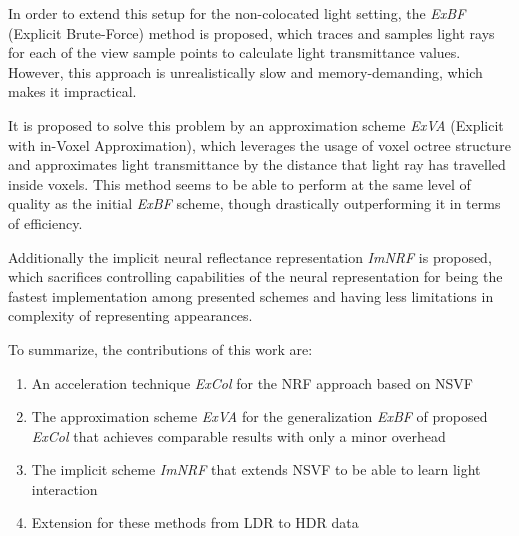 In order to extend this setup for the non-colocated light setting, the \textit{ExBF} (Explicit Brute-Force) method is proposed,
which traces and samples light rays for each of the view sample points to calculate light transmittance values.
However, this approach is unrealistically slow and memory-demanding,
which makes it impractical.

It is proposed to solve this problem by an approximation scheme \textit{ExVA} (Explicit with in-Voxel Approximation),
which leverages the usage of voxel octree structure
and approximates light transmittance by the distance that light ray has travelled inside voxels.
This method seems to be able to perform at the same level of quality as the initial \textit{ExBF} scheme,
though drastically outperforming it in terms of efficiency.

Additionally the implicit neural reflectance representation \textit{ImNRF} is proposed,
which sacrifices controlling capabilities of the neural representation
for being the fastest implementation among presented schemes
and having less limitations in complexity of representing appearances.


To summarize, the contributions of this work are:
\begin{enumerate}
    \item An acceleration technique \textit{ExCol} for the NRF approach
    based on NSVF
    \item The approximation scheme \textit{ExVA}
    for the generalization \textit{ExBF} of proposed \textit{ExCol}
    that achieves comparable results with only a minor overhead
    \item The implicit scheme \textit{ImNRF} that extends NSVF to be able to learn light interaction
    \item Extension for these methods from LDR to HDR data
\end{enumerate}











